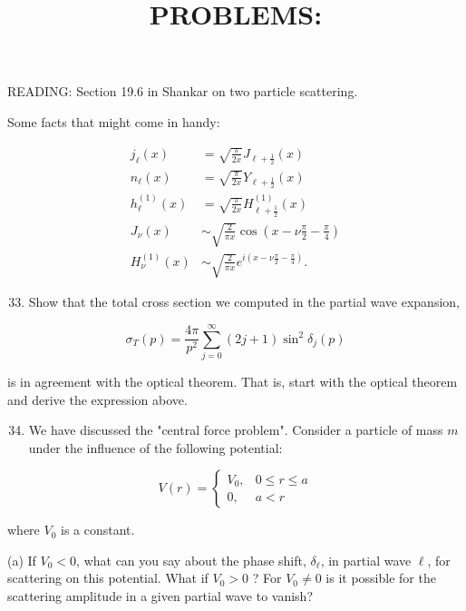 \documentclass[10pt]{article}
\title{PROBLEMS: }
\author{}
\date{}
\begin{document}
\maketitle
READING: Section 19.6 in Shankar on two particle scattering.

Some facts that might come in handy:


\begin{align*}
j_{\ell}(x) & =\sqrt{\frac{\pi}{2 x}} J_{\ell+\frac{1}{2}}(x)  \tag{1}\\
n_{\ell}(x) & =\sqrt{\frac{\pi}{2 x}} Y_{\ell+\frac{1}{2}}(x)  \tag{2}\\
h_{\ell}^{(1)}(x) & =\sqrt{\frac{\pi}{2 x}} H_{\ell+\frac{1}{2}}^{(1)}(x)  \tag{3}\\
J_{\nu}(x) & \sim \sqrt{\frac{2}{\pi x}} \cos \left(x-\nu \frac{\pi}{2}-\frac{\pi}{4}\right)  \tag{4}\\
H_{\nu}^{(1)}(x) & \sim \sqrt{\frac{2}{\pi x}} e^{i\left(x-\nu \frac{\pi}{2}-\frac{\pi}{4}\right)} . \tag{5}
\end{align*}


\begin{enumerate}
  \setcounter{enumi}{32}
  \item Show that the total cross section we computed in the partial wave expansion,
\end{enumerate}


\begin{equation*}
\sigma_{T}(p)=\frac{4 \pi}{p^{2}} \sum_{j=0}^{\infty}(2 j+1) \sin ^{2} \delta_{j}(p) \tag{6}
\end{equation*}


is in agreement with the optical theorem. That is, start with the optical theorem and derive the expression above.

\begin{enumerate}
  \setcounter{enumi}{33}
  \item We have discussed the "central force problem". Consider a particle of mass $m$ under the influence of the following potential:
\end{enumerate}

\[
V(r)= \begin{cases}V_{0}, & 0 \leq r \leq a  \tag{7}\\ 0, & a<r\end{cases}
\]

where $V_{0}$ is a constant.

(a) If $V_{0}<0$, what can you say about the phase shift, $\delta_{\ell}$, in partial wave $\ell$, for scattering on this potential. What if $V_{0}>0$ ? For $V_{0} \neq 0$ is it possible for the scattering amplitude in a given partial wave to vanish?
\end{document}
